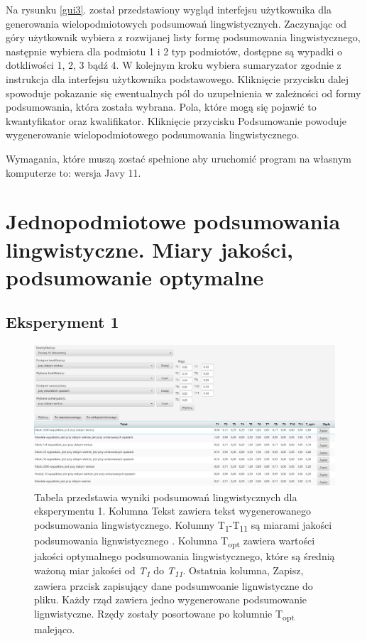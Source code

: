 \documentclass{classrep}
\begin{document}
\newpage

Na rysunku \ref{gui3}. został przedstawiony wygląd interfejsu użytkownika dla generowania wielopodmiotowych podsumowań lingwistycznych. Zaczynając od góry użytkownik wybiera z rozwijanej listy formę podsumowania lingwistycznego, następnie wybiera dla podmiotu 1 i 2 typ podmiotów, dostępne są wypadki o dotkliwości 1, 2, 3 bądź 4. W kolejnym kroku wybiera sumaryzator zgodnie z instrukcja dla interfejsu użytkownika podstawowego. Kliknięcie przycisku dalej spowoduje pokazanie się ewentualnych pól do uzupełnienia w zależności od formy podsumowania, która została wybrana. Pola, które mogą się pojawić to kwantyfikator oraz kwalifikator. Kliknięcie przycisku Podsumowanie powoduje wygenerowanie wielopodmiotowego podsumowania lingwistycznego.


Wymagania, które muszą zostać spełnione aby uruchomić program na własnym komputerze to: wersja Javy 11.

\newpage




\section{ Jednopodmiotowe podsumowania lingwistyczne. Miary jakości, podsumowanie optymalne}
\label{section:ex}
\subsection{Eksperyment 1}
\label{section:ex1}
\begin{figure}[h!]
\centering
\includegraphics[width=15cm]{ex1.png}
\vspace{-0.3cm}
\caption{Tabela przedstawia wyniki podsumowań lingwistycznych dla eksperymentu 1. Kolumna Tekst zawiera tekst wygenerowanego podsumowania lingwistycznego. Kolumny  T\textsubscript{1}-T\textsubscript{11} są miarami jakości podsumowania lignwistycznego \cite{niewiadomski19}. Kolumna T\textsubscript{opt} zawiera wartości jakości optymalnego podsumowania lingwistycznego, które są średnią ważoną miar jakości od \textit{T\textsubscript{1}} do \textit{T\textsubscript{11}}. Ostatnia kolumna, Zapisz, zawiera przcisk zapisujący dane podsumwoanie lignwistyczne do pliku. Każdy rząd zawiera jedno wygenerowane podsumowanie lignwistyczne. Rzędy zostały posortowane po kolumnie T\textsubscript{opt} malejąco. }
\label{ex1}
\end{figure}
\end{document}
